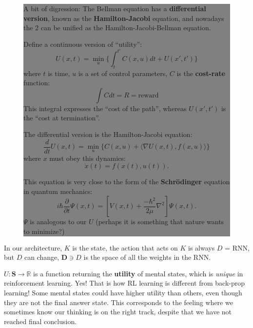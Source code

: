 \documentclass[12pt]{article}
\begin{document}
\begin{figure}[!h!t!b!p]
\begin{center}
\colorbox{grey}{\parbox{0.95\textwidth}{\setlength{\parskip}{2.5ex}
A bit of digression:  The Bellman equation has a \textbf{differential version}, known as the \textbf{Hamilton-Jacobi} equation, and nowadays the 2 can be unified as the Hamilton-Jacobi-Bellman equation.

Define a continuous version of ``utility'':
\begin{equation}
U(x,t) = \min_u \{ \int_t^{t'} C(x,u)dt + U(x',t') \} 
\end{equation}
where $t$ is time, $u$ is a set of control parameters, $C$ is the \textbf{cost-rate} function:
\begin{equation}
\int C dt = R = \mbox{reward}
\end{equation}
This integral expresses the ``cost of the path'', whereas $U(x',t')$ is the ``cost at termination''.

The differential version is the Hamilton-Jacobi equation:
\begin{equation}
\frac{d}{dt} U(x,t) = \min_u \{ C(x,u) + \langle \nabla U(x,t), f(x,u) \rangle \} 
\end{equation}
where $x$ must obey this dynamics:
\begin{equation}
\dot{x}(t) = f(x(t),u(t)).
\end{equation}

This equation is very close to the form of the \textbf{Schr\"{o}dinger} equation in quantum mechanics:
\begin{equation}
i \hbar \frac{\partial}{\partial t} \Psi(x,t) = \left[ V(x,t) + \frac{-\hbar^2}{2\mu} \nabla^2 \right] \Psi(x,t).
\end{equation}
$\Psi$ is analogous to our $U$ (perhaps it is something that nature wants to minimize?)
}}
\end{center}
\end{figure}


In our architecture, $K$ is the state, the action that acts on $K$ is always $D$ = RNN, but $D$ can change, $\mathbf{D} \ni D$ is the space of all the weights in the RNN.

$ U: \mathbf{S} \rightarrow \mathbb{R} $ is a function returning the \textbf{utility} of mental states, which is \textit{unique} in reinforcement learning.  Yes! That is how RL learning is different from back-prop learning!  Some mental states could have higher utility than others, even though they are not the final answer state.  This corresponds to the feeling where we sometimes know our thinking is on the right track, despite that we have not reached final conclusion.
\end{document}

